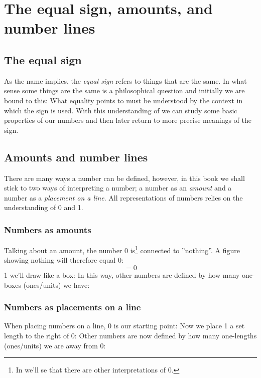 



\newpage
\section{The equal sign, amounts, and number lines}
\subsection*{The equal sign}
As the name implies, the \textit{equal sign}  \sym{$ = $} refers to things that are the same. In what sense some things are the same is a philosophical question and initially we are bound to this: What equality \sym{$=$} points to must be understood by the context in which the sign is used. With this understanding of \sym{=} we can study some basic properties of our numbers and then later return to more precise meanings of the sign. \regv
{}
\subsection*{Amounts and number lines}
There are many ways a number can be defined, however, in this book we shall stick to two ways of interpreting a number; a number as an \textsl{amount} and a number as a \textsl{placement on a line}. All representations of numbers relies on the understanding of 0 and 1.

\subsubsection*{Numbers as amounts}
	Talking about an amount, the number 0 is\footnote{In  we'll se that there are other interpretations of 0.} connected to ''nothing''. A figure showing nothing will therefore equal 0:
	\[ =0 \]
	1 we'll draw like a box:
In this way, other numbers are defined by how many one-boxes (ones/units) we have:
\newpage	
\subsubsection*{Numbers as placements on a line}
	When placing numbers on a line, 0 is our starting point:
	Now we place 1 a set length to the right of 0:
	Other numbers are now defined by how many one-lengths (ones/units) we are away from 0:
